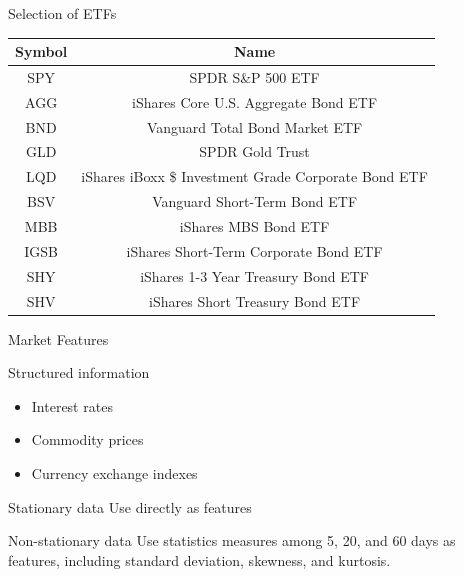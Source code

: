 \begin{frame}{Selection of ETFs}
    \begin{tabular}{|| c | c ||}
    \hline
    Symbol & Name  \\ \hline \hline
    SPY&SPDR S\&P 500 ETF \\ \hline
    AGG&iShares Core U.S. Aggregate Bond ETF \\ \hline
    BND&Vanguard Total Bond Market ETF \\ \hline
    GLD&SPDR Gold Trust \\ \hline
    LQD&iShares iBoxx \$ Investment Grade Corporate Bond ETF \\ \hline
    BSV&Vanguard Short-Term Bond ETF \\ \hline
    MBB&iShares MBS Bond ETF \\ \hline
    IGSB&iShares Short-Term Corporate Bond ETF \\ \hline
    SHY&iShares 1-3 Year Treasury Bond ETF \\ \hline
    SHV&iShares Short Treasury Bond ETF \\ \hline
    \end{tabular}
\end{frame}


\begin{frame}{Market Features}
\begin{block}{Structured information}
\begin{itemize}
    \item Interest rates
    \item Commodity prices
    \item Currency exchange indexes
\end{itemize}
\end{block}
\begin{block}{Stationary data}
   Use directly as features
\end{block}
\begin{block}{Non-stationary data}
    Use statistics measures among 5, 20, and 60 days as features, including standard deviation, skewness, and kurtosis.
\end{block}
\end{frame}

